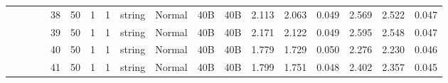 \begin{landscape}
\begin{table}[]
{\begin{tabular}{@{}ccccllllllllllllll@{}}
                                                                                   &                              &                                &                                                                                                          & 38                                                    & 50                                       & 1                                          & 1                                 & string                           & Normal                             & 40B                                           & 40B                                             & 2.113                   & 2.063    & 0.049                        & 2.569                   & 2.522    & 0.047                        \\
                                                                                   &                              &                                &                                                                                                          & 39                                                    & 50                                       & 1                                          & 1                                 & string                           & Normal                             & 40B                                           & 40B                                             & 2.171                   & 2.122    & 0.049                        & 2.595                   & 2.548    & 0.047                        \\
                                                                                   &                              &                                &                                                                                                          & 40                                                    & 50                                       & 1                                          & 1                                 & string                           & Normal                             & 40B                                           & 40B                                             & 1.779                   & 1.729    & 0.050                        & 2.276                   & 2.230    & 0.046                        \\
                                                                                   &                              &                                &                                                                                                          & 41                                                    & 50                                       & 1                                          & 1                                 & string                           & Normal                             & 40B                                           & 40B                                             & 1.799                   & 1.751    & 0.048                        & 2.402                   & 2.357    & 0.045                        \\

\end{tabular}}
\end{table}
\end{landscape}
